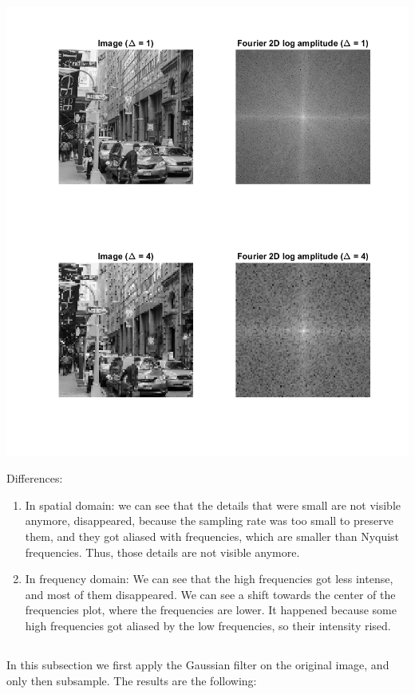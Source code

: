 \documentclass[a4paper]{iacas}
\begin{document}
\vskip 0.1in
\begin{minipage}{1\textwidth}
\centering
	\includegraphics[scale=0.7]{../imgs/q1_6.png}
\end{minipage}
\vskip 0.1in

Differences:
\begin{enumerate}
\item In spatial domain: we can see that the details that were small are not visible anymore, disappeared, because the sampling rate was too small to preserve them, and they got aliased with frequencies, which are smaller than Nyquist frequencies. Thus, those details are not visible anymore.
\item In frequency domain: We can see that the high frequencies got less intense, and most of them disappeared. We can see a shift towards the center of the frequencies plot, where the frequencies are lower. It happened because some high frequencies got aliased by the low frequencies, so their intensity rised.
\end{enumerate}

\subsection{}
In this subsection we first apply the Gaussian filter on the original image, and only then subsample. The results are the following:
\end{document}
